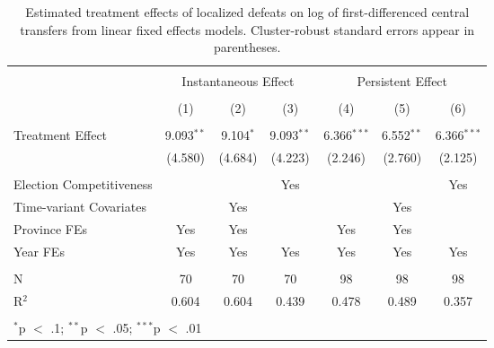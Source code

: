 
\begin{table}[!htbp] \centering 
  \caption{Estimated treatment effects of localized defeats on log of first-differenced central transfers from linear fixed effects models. Cluster-robust standard errors appear in parentheses.} 
  \label{tab:lfe_main} 
\begin{tabular}{@{\extracolsep{5pt}}lcccccc} 
\\[-1.8ex]\hline 
\hline \\[-1.8ex] 
 & \multicolumn{3}{c}{Instantaneous Effect} & \multicolumn{3}{c}{Persistent Effect} \\ 
\\[-1.8ex] & (1) & (2) & (3) & (4) & (5) & (6)\\ 
\hline \\[-1.8ex] 
 Treatment Effect & 9.093$^{**}$ & 9.104$^{*}$ & 9.093$^{**}$ & 6.366$^{***}$ & 6.552$^{**}$ & 6.366$^{***}$ \\ 
  & (4.580) & (4.684) & (4.223) & (2.246) & (2.760) & (2.125) \\ 
 \hline \\[-1.8ex] 
Election Competitiveness &  &  & Yes &  &  & Yes \\ 
Time-variant Covariates &  & Yes &  &  & Yes &  \\ 
Province FEs & Yes & Yes &  & Yes & Yes &  \\ 
Year FEs & Yes & Yes & Yes & Yes & Yes & Yes \\ 
\hline \\[-1.8ex] 
N & 70 & 70 & 70 & 98 & 98 & 98 \\ 
R$^{2}$ & 0.604 & 0.604 & 0.439 & 0.478 & 0.489 & 0.357 \\ 
\hline 
\hline \\[-1.8ex] 
\multicolumn{7}{l}{$^{*}$p $<$ .1; $^{**}$p $<$ .05; $^{***}$p $<$ .01} \\ 
\end{tabular} 
\end{table} 
